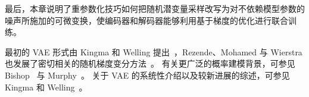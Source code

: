最后，本章说明了重参数化技巧如何把随机潜变量采样改写为对不依赖模型参数的噪声所施加的可微变换，使编码器和解码器能够利用基于梯度的优化进行联合训练。

最初的 VAE 形式由 Kingma 和 Welling 提出~\cite{kingma2014autoencoding}，Rezende、Mohamed 与 Wierstra 也发展了密切相关的随机梯度变分方法~\cite{rezende2014stochastic}。
有关更广泛的概率建模背景，可参见 Bishop~\cite{bishop2006prml} 与 Murphy~\cite{murphy2012ml}。
关于 VAE 的系统性介绍以及较新进展的综述，可参见 Kingma 和 Welling~\cite{kingma2019introduction}。
